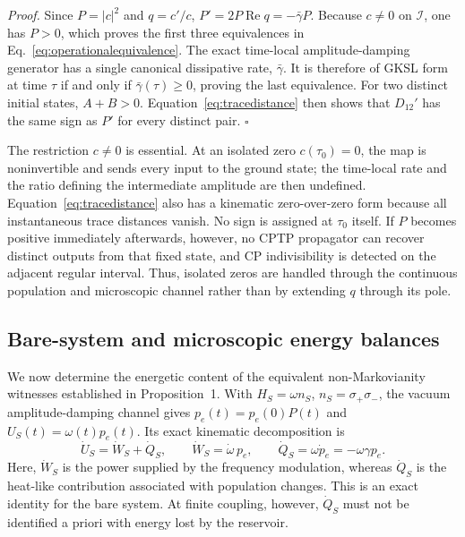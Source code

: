 \documentclass[reprint,superscriptaddress,floatfix,amsmath,amssymb,prresearch,aps]{revtex4-2}
\newcommand{\Ree}{\operatorname{Re}}
\begin{document}
\textit{Proof.}
Since \(P=|c|^2\) and \(q=c'/c\),
\(P'=2P\Ree q=-\bar\gamma P\). Because \(c\neq0\) on
\(\mathcal I\), one has \(P>0\), which proves the
first three equivalences in Eq.~\eqref{eq:operationalequivalence}. The exact
time-local amplitude-damping generator has a single canonical dissipative
rate, \(\bar\gamma\). It is therefore of GKSL form at time \(\tau\) if and
only if \(\bar\gamma(\tau)\geq0\), proving the last equivalence. For two
distinct initial states, \(A+B>0\). Equation~\eqref{eq:tracedistance} then
shows that \(D_{12}'\) has the same sign as \(P'\) for every distinct pair.
\hfill\(\square\)

The restriction \(c\neq0\) is essential. At an isolated zero
\(c(\tau_0)=0\), the map is noninvertible and sends every input to the ground
state; the time-local rate and the ratio defining the intermediate amplitude
are then undefined. Equation~\eqref{eq:tracedistance} also has a kinematic
zero-over-zero form because all instantaneous trace distances vanish. No sign
is assigned at \(\tau_0\) itself. If \(P\) becomes positive immediately
afterwards, however, no CPTP propagator can recover distinct outputs from that
fixed state, and CP indivisibility is detected on the adjacent regular
interval. Thus, isolated zeros are handled through the continuous population
and microscopic channel rather than by extending \(q\) through its pole.

\subsection{Bare-system and microscopic energy balances}

We now determine the energetic content of the equivalent non-Markovianity
witnesses established in Proposition~1. With
\(H_S=\omega n_S\), \(n_S=\sigma_+\sigma_-\), the vacuum
amplitude-damping channel gives \(p_e(t)=p_e(0)P(t)\) and
\(U_S(t)=\omega(t)p_e(t)\). Its exact kinematic decomposition is
\begin{equation}
\dot U_S=\dot W_S+\dot Q_S,
\qquad
\dot W_S=\dot\omega\,p_e,
\qquad
\dot Q_S=\omega\dot p_e=-\omega\gamma p_e.
\label{eq:systemenergybalance}
\end{equation}
Here, \(\dot W_S\) is the power supplied by the frequency modulation, whereas
\(\dot Q_S\) is the heat-like contribution associated with population
changes. This is an exact identity for the bare system. At finite coupling,
however, \(\dot Q_S\) must not be identified
a priori with energy lost by the reservoir.
\end{document}
